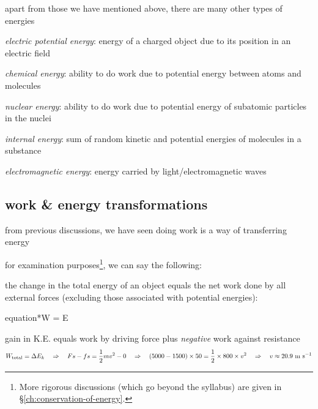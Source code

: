 apart from those we have mentioned above, there are many other types of energies 

\emph{electric potential energy}: energy of a charged object due to its position in an electric field

\titem \emph{chemical energy}: ability to do work due to potential energy between atoms and molecules

\titem \emph{nuclear energy}: ability to do work due to potential energy of subatomic particles in the nuclei

\titem \emph{internal energy}: sum of random kinetic and potential energies of molecules in a substance

\titem \emph{electromagnetic energy}: energy carried by light/electromagnetic waves


\subsection{work \& energy transformations}

from previous discussions, we have seen doing work is a way of transferring energy

for examination purposes\footnote{More rigorous discussions (which go beyond the syllabus) are given in \S\ref{ch:conservation-of-energy}.}, we can say the following:

\begin{ilight}
	the change in the total energy of an object equals the net work done by all external forces (excluding those associated with potential energies): \begin{empheq}[box=\tcbhighmath]{equation*}{W  = \Delta E} \end{empheq}
\end{ilight}


\begin{soln} gain in K.E. equals work by driving force plus \emph{negative} work against resistance
\begin{equation*}
W_\text{total} = \Delta E_k \quad \Rightarrow \quad Fs - fs = \frac{1}{2}mv^2 - 0 \quad \Rightarrow \quad (5000 - 1500)\times50 = \frac{1}{2}\times800\times v^2 \quad \Rightarrow \quad v\approx20.9\text{ m s$^{-1}$} 
\end{equation*}
\end{soln}


